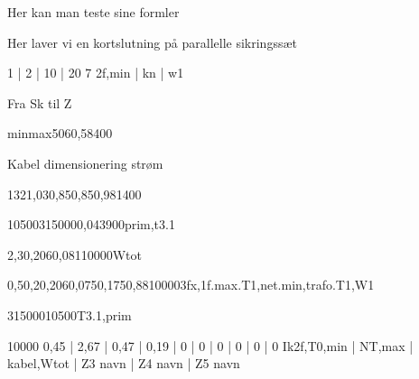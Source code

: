 \documentclass[a4paper,oneside,10pt,danish]{report}
\begin{document}
Her kan man teste sine formler

 
 Her laver vi en kortslutning på parallelle sikringssæt
	\begin{LV-Ik2f,parSikr-kA}
		{ 1 | 2 | 10 | 20 }
		{7}
		{2f,min | kn | w1}
	\end{LV-Ik2f,parSikr-kA} 
 
 
Fra Sk til Z
\begin{FraSkTilZ}{min}{max}{50}{6}{0,58}{400}
\end{FraSkTilZ}

Kabel dimensionering strøm
\begin{Iz,min}{132}{1,03}{0,85}{0,85}{0,98}{1}{400}
\end{Iz,min}

\begin{Ztrafo}{10500}{315000}{0,04}{3900}{prim,t3.1}
\end{Ztrafo}

\begin{Zkabel}{2,3}{0,206}{0,081}{10000}{Wtot}
\end{Zkabel}


\begin{ZtilIkHV}{0,5}{0,2}{0,206}{0,075}{0,175}{0,88}{10000}{3fx,1f.max.T1,net.min,trafo.T1,W1}
\end{ZtilIkHV}


\begin{TrafoFuldlast}{315000}{10500}{T3.1,prim}
\end{TrafoFuldlast}

\begin{HV-ZtilIk2f}{10000}{ 0,45 | 2,67 | 0,47 | 0,19 | 0 | 0 | 0 | 0 | 0 | 0 }{Ik2f,T0,min | NT,max | kabel,Wtot | Z3 navn | Z4 navn | Z5 navn}
\end{HV-ZtilIk2f}
\end{document}
